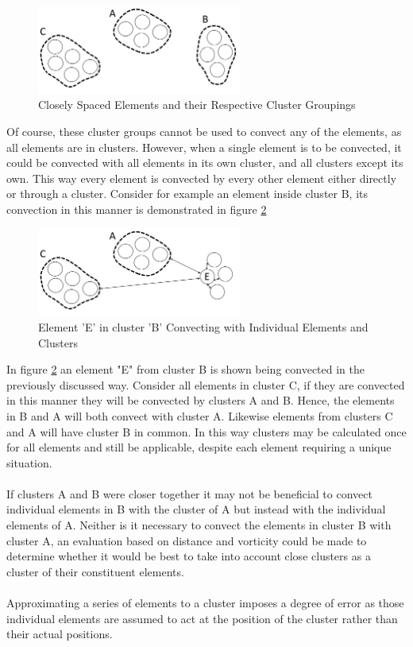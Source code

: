 \begin{figure}[H]
\centering
\includegraphics[width=0.6\textwidth]{Figures/ThreeClusters_Example.png}
\caption{\label{fig:ThreeClusters}Closely Spaced Elements and their Respective Cluster Groupings}
\end{figure}

Of course, these cluster groups cannot be used to convect any of the elements, as all elements are in clusters. However, when a single element is to be convected, it could be convected with all elements in its own cluster, and all clusters except its own. This way every element is convected by every other element either directly or through a cluster. Consider for example an element inside cluster B, its convection in this manner is demonstrated in figure \ref{fig:EinB}

\begin{figure}[H]
\centering
\includegraphics[width=0.6\textwidth]{Figures/ElementInB.png}
\caption{\label{fig:EinB}Element 'E' in cluster 'B' Convecting with Individual Elements and Clusters}
\end{figure}

In figure \ref{fig:EinB} an element "E" from cluster B is shown being convected in the previously discussed way. Consider all elements in cluster C, if they are convected in this manner they will be convected by clusters A and B. Hence, the elements in B and A will both convect with cluster A. Likewise elements from clusters C and A will have cluster B in common. In this way clusters may be calculated once for all elements and still be applicable, despite each element requiring a unique situation.
\\\\
If clusters A and B were closer together it may not be beneficial to convect individual elements in B with the cluster of A but instead with the individual elements of A. Neither is it necessary to convect the elements in cluster B with cluster A, an evaluation based on distance and vorticity could be made to determine whether it would be best to take into account close clusters as a cluster of their constituent elements.
\\\\
Approximating a series of elements to a cluster imposes a degree of error as those individual elements are assumed to act at the position of the cluster rather than their actual positions.

